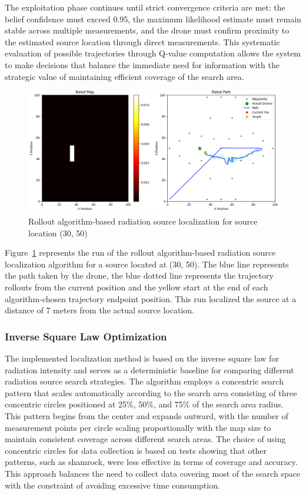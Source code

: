 \documentclass[../report.tex]{subfiles}
\begin{document}
    The exploitation phase continues until strict convergence criteria are met: the belief confidence must exceed 0.95, the maximum likelihood estimate must remain stable across multiple 
    measurements, and the drone must confirm proximity to the estimated source location through direct measurements. This systematic evaluation of possible trajectories through Q-value 
    computation allows the system to make decisions that balance the immediate need for information with the strategic value of maintaining efficient coverage of the search area.
    \begin{figure}[ht]
        \centering
        \includegraphics[width=\linewidth]{figures/rollout_algorithm.png}
        \caption{Rollout algorithm-based radiation source localization for source location (30, 50)}
        \label{fig:rollout_algorithm_plot}
    \end{figure}

    Figure~\ref{fig:rollout_algorithm_plot} represents the run of the rollout algorithm-based radiation source localization algorithm for a source located at (30, 50). The blue line represents 
    the path taken by the drone, the blue dotted line represents the trajectory rollouts from the current position and the yellow start at the end of each algorithm-chosen trajectory endpoint
    position. This run localized the source at a distance of 7 meters from the actual source location. 

    \subsubsection{Inverse Square Law Optimization}
    The implemented localization method is based on the inverse square law for radiation intensity and serves as a deterministic baseline for comparing different 
    radiation source search strategies. The algorithm employs a concentric search pattern that scales automatically according to the search area consisting of 
    three concentric circles positioned at 25\%, 50\%, and 75\% of the search area radius. This pattern begins from the center and expands outward, with the number 
    of measurement points per circle scaling proportionally with the map size to maintain consistent coverage across different search areas. The choice of using 
    concentric circles for data collection is based on tests showing that other patterns, such as shamrock, were less effective in terms of coverage and accuracy. 
    This approach balances the need to collect data covering most of the search space with the constraint of avoiding excessive time consumption.
\end{document}
